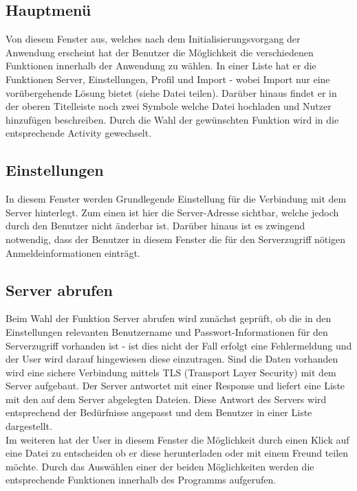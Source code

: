 \documentclass[10pt, a4paper]{scrreprt}
\begin{document}
\subsection{Hauptmenü}
Von diesem Fenster aus, welches nach dem Initialisierungsvorgang der Anwendung erscheint hat der Benutzer die Möglichkeit die verschiedenen Funktionen innerhalb der Anwendung zu wählen. In einer Liste hat er die Funktionen Server, Einstellungen, Profil und Import - wobei Import nur eine vorübergehende Lösung bietet  (siehe Datei teilen). Darüber hinaus findet er in der oberen Titelleiste noch zwei Symbole welche Datei hochladen und Nutzer hinzufügen beschreiben. Durch die Wahl der gewünschten Funktion wird in die entsprechende Activity gewechselt.


\subsection{Einstellungen}
In diesem Fenster werden Grundlegende Einstellung für die Verbindung mit dem Server hinterlegt. Zum einen ist hier die Server-Adresse sichtbar, welche jedoch durch den Benutzer nicht änderbar ist. Darüber hinaus ist es zwingend notwendig, dass der Benutzer in diesem Fenster die für den Serverzugriff nötigen Anmeldeinformationen einträgt.


\subsection{Server abrufen}
Beim Wahl der Funktion Server abrufen wird zunächst geprüft, ob die in den Einstellungen relevanten Benutzername und Passwort-Informationen für den Serverzugriff vorhanden ist - ist dies nicht der Fall erfolgt eine Fehlermeldung und der User wird darauf hingewiesen diese einzutragen. Sind die Daten vorhanden wird eine sichere Verbindung mittels TLS (Transport Layer Security) mit dem Server aufgebaut. Der Server antwortet mit einer Response und liefert eine Liste mit den auf dem Server abgelegten Dateien. Diese Antwort des Servers wird entsprechend der Bedürfnisse angepasst und dem Benutzer in einer Liste dargestellt. \\
Im weiteren hat der User in diesem Fenster die Möglichkeit durch einen Klick auf eine Datei zu entscheiden ob er diese herunterladen oder mit einem Freund teilen möchte. Durch das Auswählen einer der beiden Möglichkeiten werden die entsprechende Funktionen innerhalb des Programms aufgerufen.
\end{document}
